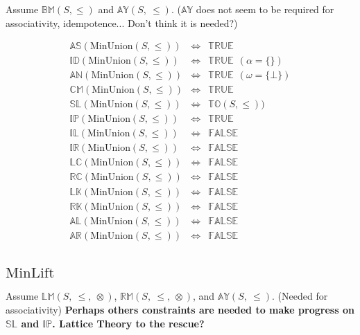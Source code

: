 \documentclass[10pt]{article}
\newcommand{\propname}[1]{{\mathbb{#1}}}
\begin{document}
Assume $\propname{BM}(S,\leq)$ and $\propname{AY}(S,\ \leq)$. 
($\propname{AY}$ does not seem to be required for associativity, idempotence... Don't think it is needed?)

\[
\begin{array}{rcl} 
\propname{AS}(\mathrm{MinUnion}(S, \leq)) 
  & \Leftrightarrow 
  & \propname{TRUE}
  \\ 
\propname{ID}(\mathrm{MinUnion}(S, \leq)) 
  & \Leftrightarrow 
  & \propname{TRUE} \ \ (\alpha = \{\})
  \\ 
\propname{AN}(\mathrm{MinUnion}(S, \leq)) 
  & \Leftrightarrow 
  & \propname{TRUE} \ \ (\omega = \{\bot\})
  \\
\propname{CM}(\mathrm{MinUnion}(S, \leq)) 
  & \Leftrightarrow 
  & \propname{TRUE}
  \\ 
\propname{SL}(\mathrm{MinUnion}(S, \leq)) 
  & \Leftrightarrow 
  & \propname{TO}(S, \leq))  
  \\ 
\propname{IP}(\mathrm{MinUnion}(S, \leq)) 
  & \Leftrightarrow 
  & \propname{TRUE}
  \\ 
\propname{IL}(\mathrm{MinUnion}(S, \leq)) 
  & \Leftrightarrow 
  & \propname{FALSE}
  \\ 
\propname{IR}(\mathrm{MinUnion}(S, \leq)) 
  & \Leftrightarrow 
  & \propname{FALSE}
  \\ 
\propname{LC}(\mathrm{MinUnion}(S, \leq)) 
  & \Leftrightarrow 
  & \propname{FALSE}
  \\ 
\propname{RC}(\mathrm{MinUnion}(S, \leq)) 
  & \Leftrightarrow 
  & \propname{FALSE} 
  \\ 
\propname{LK}(\mathrm{MinUnion}(S, \leq)) 
  & \Leftrightarrow 
  & \propname{FALSE} 
  \\ 
\propname{RK}(\mathrm{MinUnion}(S, \leq)) 
  & \Leftrightarrow 
  & \propname{FALSE}
  \\ 
\propname{AL}(\mathrm{MinUnion}(S, \leq))  
  & \Leftrightarrow 
  & \propname{FALSE} 
  \\ 
\propname{AR}(\mathrm{MinUnion}(S, \leq))  
  & \Leftrightarrow 
  & \propname{FALSE} 
  \\ 
\end{array} 
\] 

\subsection{$\mathrm{MinLift}$} 

Assume 
$\propname{LM}(S,\ \leq,\ \otimes)$, 
$\propname{RM}(S,\ \leq,\ \otimes)$, 
and 
$\propname{AY}(S,\ \leq)$. 
(Needed for associativity) 
{\bf Perhaps others constraints are needed to make progress on 
$\propname{SL}$ and $\propname{IP}$. 
Lattice Theory to the rescue?
}
\end{document}
